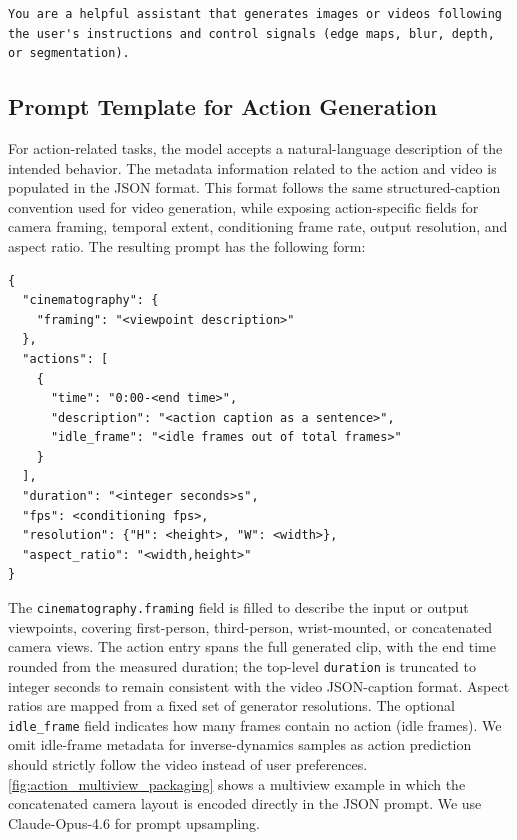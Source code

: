 \documentclass{llmxive}
\begin{document}
\begin{tcolorbox}[
    breakable,
    colback=black!2,
    colframe=nvidiagreen!75!white,
    boxrule=0.4pt,
    arc=1pt,
    left=4pt,
    right=4pt,
    top=4pt,
    bottom=4pt,
    title=Cosmos 3 Base Generator Video-to-Video Transfer Prompt Prefix
]
\begin{Verbatim}[breaklines=true,breakanywhere=true,fontsize=\scriptsize]
You are a helpful assistant that generates images or videos following the user's instructions and control signals (edge maps, blur, depth, or segmentation).
\end{Verbatim}
\end{tcolorbox}

\subsection{Prompt Template for Action Generation}
\label{appendix:action_upsampler_prompt}
For action-related tasks, the model accepts a natural-language description of the intended behavior. The metadata information related to the action and video is populated in the JSON format. This format follows the same structured-caption convention used for video generation, while exposing action-specific fields for camera framing, temporal extent, conditioning frame rate, output resolution, and aspect ratio. The resulting prompt has the following form:

\begin{tcolorbox}[
    breakable,
    colback=black!2,
    colframe=nvidiagreen!75!white,
    boxrule=0.4pt,
    arc=1pt,
    left=4pt,
    right=4pt,
    top=4pt,
    bottom=4pt,
    title=Action Generation JSON Prompt Template
]
\begin{Verbatim}[breaklines=true,breakanywhere=true,fontsize=\scriptsize]
{
  "cinematography": {
    "framing": "<viewpoint description>"
  },
  "actions": [
    {
      "time": "0:00-<end time>",
      "description": "<action caption as a sentence>",
      "idle_frame": "<idle frames out of total frames>"
    }
  ],
  "duration": "<integer seconds>s",
  "fps": <conditioning fps>,
  "resolution": {"H": <height>, "W": <width>},
  "aspect_ratio": "<width,height>"
}
\end{Verbatim}
\end{tcolorbox}

The \texttt{cinematography.framing} field is filled to describe the input or output viewpoints, covering first-person, third-person, wrist-mounted, or concatenated camera views.
The action entry spans the full generated clip, with the end time rounded from the measured duration; the top-level \texttt{duration} is truncated to integer seconds to remain consistent with the video JSON-caption format.
Aspect ratios are mapped from a fixed set of generator resolutions.
The optional \texttt{idle\_frame} field indicates how many frames contain no action (idle frames).
We omit idle-frame metadata for inverse-dynamics samples as action prediction should strictly follow the video instead of user preferences.
\cref{fig:action_multiview_packaging} shows a multiview example in which the concatenated camera layout is encoded directly in the JSON prompt. We use Claude-Opus-4.6 for prompt upsampling.
\end{document}
